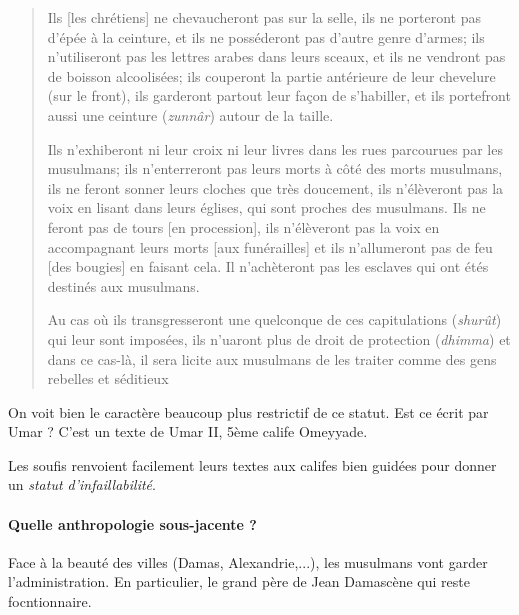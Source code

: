 

\begin{quote}
 Ils [les chrétiens] ne chevaucheront pas sur la selle, ils ne porteront pas d'épée à la ceinture, et ils ne posséderont pas d'autre genre d'armes; ils n'utiliseront pas les lettres arabes dans leurs sceaux, et ils ne vendront pas de boisson alcoolisées; ils couperont la partie antérieure de leur chevelure (sur le front), ils garderont partout leur façon de s'habiller, et ils portefront aussi une ceinture (\textit{zunnâr}) autour de la taille.
 
 Ils n'exhiberont ni leur croix ni leur livres dans les rues parcourues par les musulmans; ils n'enterreront pas leurs morts à côté des morts musulmans, ils ne feront sonner leurs cloches que très doucement, ils n'élèveront pas la voix en lisant dans leurs églises, qui sont proches des musulmans.
 Ils ne feront pas de tours [en procession], ils n'élèveront pas la voix en accompagnant leurs morts [aux funérailles] et ils n'allumeront pas de feu [des bougies] en faisant cela. Il n'achèteront pas les esclaves qui ont étés destinés aux musulmans.

 Au cas où ils transgresseront une quelconque de ces capitulations (\textit{shurût}) qui leur sont imposées, ils n'uaront plus de droit de protection (\textit{dhimma}) et dans ce cas-là, il sera licite aux musulmans de les traiter comme des gens rebelles et séditieux

 \end{quote}
On voit bien le caractère beaucoup plus restrictif de ce statut.
 Est ce écrit par Umar ?  C'est un texte de Umar II, 5ème calife Omeyyade.

 Les soufis renvoient facilement leurs textes aux califes bien guidées pour donner un \textit{statut d'infaillabilité}. 

 \paragraph{Quelle anthropologie sous-jacente ?} Face à la beauté des villes (Damas, Alexandrie,...), les musulmans vont garder l'administration. En particulier, le grand père de Jean Damascène qui reste focntionnaire.

 